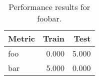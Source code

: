 \begin{table}[ht]
  \centering
  \caption{Performance results for foobar.}
  \label{tab:foobar-performance}
  \begin{tabular}{lrr}
    \toprule
    Metric & Train&Test\\
    \midrule
      foo & 0.000 & 5.000  \\
      bar & 5.000 & 0.000  \\
    \bottomrule
  \end{tabular}
\end{table}
